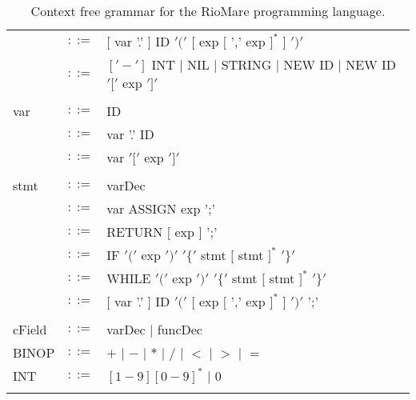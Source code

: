 \documentclass{article}
\begin{document}
\begin{table}[h]
\begin{tabular}{ l c l }
         & $::=$ & $[$ var '.' $]$ ID $'('$ $[$ exp $[$ ',' exp $]^{*}$ $]$ $')'$ \\
         & $::=$ & $['-']$ INT $|$ NIL $|$ STRING $|$ NEW ID $|$ NEW ID $'['$ exp $']'$ \\
\\
var      & $::=$ & ID                  \\
         & $::=$ & var '.' ID          \\
         & $::=$ & var $'['$ exp $']'$ \\
\\  
stmt     & $::=$ & varDec                                                             \\
         & $::=$ & var ASSIGN exp ';'                                                 \\
         & $::=$ & RETURN $[$ exp $]$ ';'                                             \\
         & $::=$ & IF $'('$ exp $')'$ $'\{'$ stmt $[$ stmt $]^{*}$ $'\}'$             \\
         & $::=$ & WHILE $'('$ exp $')'$ $'\{'$ stmt $[$ stmt $]^{*}$ $'\}'$          \\
         & $::=$ & $[$ var '.' $]$ ID $'('$ $[$ exp $[$ ',' exp $]^{*}$ $]$ $')'$ ';' \\
\\
cField   & $::=$ & varDec $|$ funcDec \\
BINOP    & $::=$ & $+$ $|$ $-$ $|$ $*$ $|$ $/$ $|$ $<$ $|$ $>$ $|$ $=$ \\
INT      & $::=$ & $[1-9][0-9]^{*}$ $|$ $0$                            \\
\\
\end{tabular}
\caption{
Context free grammar for the RioMare programming language.
\label{Table_CFG_Of_RioMare}}
\end{table}
\end{document}
